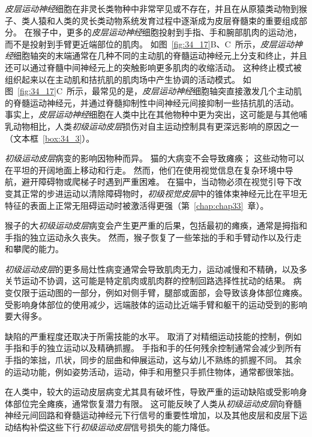 \textit{皮层运动神经}细胞在非灵长类物种中非常罕见或不存在，并且在从原猿类动物到猴子、类人猿和人类的灵长类动物系统发育过程中逐渐成为皮层脊髓束的重要组成部分。
在猴子中，更多的\textit{皮层运动神经}细胞投射到手指、手和腕部肌肉的运动池，而不是投射到手臂更近端部位的肌肉。
如图~\ref{fig:34_17}B、C~所示，\textit{皮层运动神经}细胞轴突的末端通常在几种不同的主动肌的脊髓运动神经元上分支和终止，并且还可以通过脊髓中间神经元上的突触影响更多肌肉的收缩活动。
这种终止模式被组织起来以在主动肌和拮抗肌的肌肉场中产生协调的活动模式。
如图~\ref{fig:34_17}C~所示，最常见的是，\textit{皮层运动神经}细胞轴突直接激发几个主动肌的脊髓运动神经元，并通过脊髓抑制性中间神经元间接抑制一些拮抗肌的活动。
事实上，\textit{皮层运动神经}细胞在人类中比在其他物种中更为突出，这可能是与其他哺乳动物相比，人类\textit{初级运动皮层}损伤对自主运动控制具有更深远影响的原因之一（文本框~\ref{box:34_3}）。



\begin{proposition}[初级运动皮层的损伤导致运动执行障碍] \label{box:34_3}
	
	\quad \quad \textit{初级运动皮层}病变的影响因物种而异。
	猫的大病变不会导致瘫痪；
	这些动物可以在平坦的开阔地面上移动和行走。
	然而，他们在使用视觉信息在复杂环境中导航，避开障碍物或爬梯子时遇到严重困难。
	在猫中，当动物必须在视觉引导下改变其正常的步进运动以清除障碍物时，\textit{初级视觉皮层}中的锥体束神经元比在平坦无特征的表面上正常无阻碍运动时被激活得更强（第~\ref{chap:chap33}~章）。
	
	\quad \quad 猴子的大\textit{初级运动皮层}病变会产生更严重的后果，包括最初的瘫痪，通常是拇指和手指的独立运动永久丧失。
	然而，猴子恢复了一些笨拙的手和手臂动作以及行走和攀爬的能力。
	
	\quad \quad \textit{初级运动皮层}的更多局灶性病变通常会导致肌肉无力，运动减慢和不精确，以及多关节运动不协调，这可能是特定肌肉或肌肉群的控制回路选择性扰动的结果。
	病变仅限于运动图的一部分，例如对侧手臂，腿部或面部，会导致该身体部位瘫痪。
	受影响身体部位的使用减少，远端肢体的运动比近端手臂和躯干的运动受到的影响要大得多。
	
	\quad \quad 缺陷的严重程度还取决于所需技能的水平。
	取消了对精细运动技能的控制，例如手指和手的独立运动以及精确抓握。
	手指和手的任何残余控制通常会减少到所有手指的笨拙，爪状，同步的屈曲和伸展运动，这与幼儿不熟练的抓握不同。
	其余的运动功能，例如姿势活动，运动，伸手和用整只手抓住物体，通常都很笨拙。
	
	\quad \quad 在人类中，较大的运动皮层病变尤其具有破坏性，导致严重的运动缺陷或受影响身体部位完全瘫痪，通常恢复潜力有限。
	这可能反映了人类从\textit{初级运动皮层}向脊髓神经元间回路和脊髓运动神经元下行信号的重要性增加，以及其他皮层和皮层下运动结构补偿这些下行\textit{初级运动皮层}信号损失的能力降低。
	
\end{proposition}


